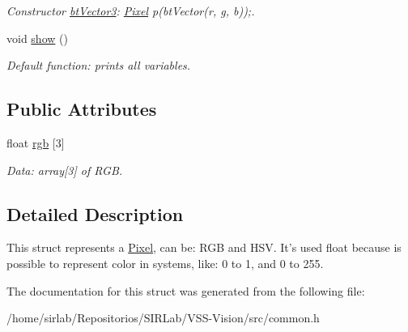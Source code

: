 \begin{DoxyCompactItemize}
\begin{DoxyCompactList}\small\item\em Constructor \hyperlink{structcommon_1_1btVector3}{bt\-Vector3}\-: \hyperlink{structcommon_1_1Pixel}{Pixel} p(bt\-Vector(r, g, b));. \end{DoxyCompactList}\item 
\hypertarget{structcommon_1_1Pixel_a384d642e3fb610b38c813ff6fd8c50e1}{void \hyperlink{structcommon_1_1Pixel_a384d642e3fb610b38c813ff6fd8c50e1}{show} ()}\label{structcommon_1_1Pixel_a384d642e3fb610b38c813ff6fd8c50e1}

\begin{DoxyCompactList}\small\item\em Default function\-: prints all variables. \end{DoxyCompactList}\end{DoxyCompactItemize}
\subsection*{Public Attributes}
\begin{DoxyCompactItemize}
\item 
\hypertarget{structcommon_1_1Pixel_abf3e7070359fa300aeed9af22c74f118}{float \hyperlink{structcommon_1_1Pixel_abf3e7070359fa300aeed9af22c74f118}{rgb} \mbox{[}3\mbox{]}}\label{structcommon_1_1Pixel_abf3e7070359fa300aeed9af22c74f118}

\begin{DoxyCompactList}\small\item\em Data\-: array\mbox{[}3\mbox{]} of R\-G\-B. \end{DoxyCompactList}\end{DoxyCompactItemize}


\subsection{Detailed Description}
This struct represents a \hyperlink{structcommon_1_1Pixel}{Pixel}, can be\-: R\-G\-B and H\-S\-V. It's used float because is possible to represent color in systems, like\-: 0 to 1, and 0 to 255. 

The documentation for this struct was generated from the following file\-:\begin{DoxyCompactItemize}
\item 
/home/sirlab/\-Repositorios/\-S\-I\-R\-Lab/\-V\-S\-S-\/\-Vision/src/common.\-h\end{DoxyCompactItemize}
